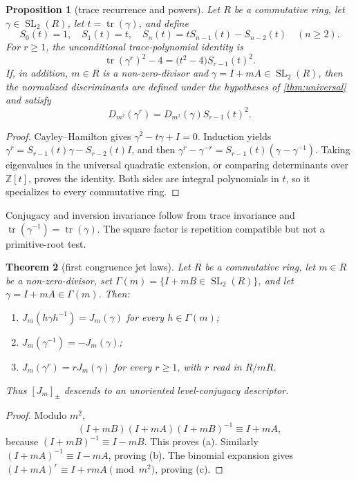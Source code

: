 \documentclass[11pt,a4paper]{article}
\newtheorem{theorem}{Theorem}[section]
\newtheorem{proposition}[theorem]{Proposition}
\theoremstyle{definition}
\theoremstyle{remark}
\newcommand{\SL}{\operatorname{SL}}
\newcommand{\tr}{\operatorname{tr}}
\begin{document}
\begin{proposition}[trace recurrence and powers]\label{prop:powerdisc}
Let \(R\) be a commutative ring, let \(\gamma\in\SL_2(R)\), let \(t=\tr(\gamma)\), and define
\[
 S_0(t)=1,\quad S_1(t)=t,\quad
 S_n(t)=tS_{n-1}(t)-S_{n-2}(t)\quad(n\ge2).
\]
For \(r\ge1\), the unconditional trace-polynomial identity is
\[
 \tr(\gamma^r)^2-4=\bigl(t^2-4\bigr)S_{r-1}(t)^2.
\]
If, in addition, \(m\in R\) is a non-zero-divisor and \(\gamma=I+mA\in\SL_2(R)\), then the normalized discriminants are defined under the hypotheses of \cref{thm:universal} and satisfy
\[
 D_{m^2}(\gamma^r)=D_{m^2}(\gamma)S_{r-1}(t)^2.
\]
\end{proposition}

\begin{proof}
Cayley--Hamilton gives \(\gamma^2-t\gamma+I=0\). Induction yields \(\gamma^r=S_{r-1}(t)\gamma-S_{r-2}(t)I\), and then
\(\gamma^r-\gamma^{-r}=S_{r-1}(t)(\gamma-\gamma^{-1})\).
Taking eigenvalues in the universal quadratic extension, or comparing determinants over \(\mathbb Z[t]\), proves the identity. Both sides are integral polynomials in \(t\), so it specializes to every commutative ring.
\end{proof}

Conjugacy and inversion invariance follow from trace invariance and \(\tr(\gamma^{-1})=\tr(\gamma)\). The square factor is repetition compatible but not a primitive-root test.

\begin{theorem}[first congruence jet laws]\label{thm:jet}
Let \(R\) be a commutative ring, let \(m\in R\) be a non-zero-divisor,
set \(\Gamma(m)=\{I+mB\in\SL_2(R)\}\), and let
\(\gamma=I+mA\in\Gamma(m)\). Then:
\begin{enumerate}[label=(\alph*)]
 \item \(J_m(h\gamma h^{-1})=J_m(\gamma)\) for every \(h\in\Gamma(m)\);
 \item \(J_m(\gamma^{-1})=-J_m(\gamma)\);
 \item \(J_m(\gamma^r)=rJ_m(\gamma)\) for every \(r\ge1\), with \(r\) read in \(R/mR\).
\end{enumerate}
Thus \([J_m]_{\pm}\) descends to an unoriented level-conjugacy descriptor.
\end{theorem}

\begin{proof}
Modulo \(m^2\),
\[
 (I+mB)(I+mA)(I+mB)^{-1}\equiv I+mA,
\]
because \((I+mB)^{-1}\equiv I-mB\). This proves (a). Similarly \((I+mA)^{-1}\equiv I-mA\), proving (b). The binomial expansion gives \((I+mA)^r\equiv I+rmA\pmod{m^2}\), proving (c).
\end{proof}
\end{document}
